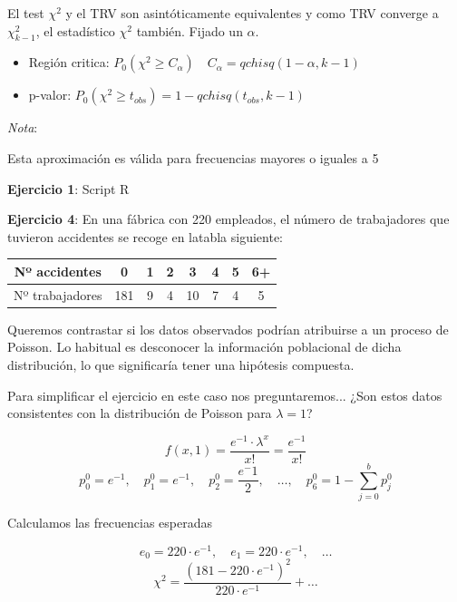 El test $\chi^2$ y el TRV son asintóticamente equivalentes y como TRV converge a $\chi^2_{k-1}$, el estadístico $\chi^2$ también.
Fijado un $\alpha$.
\begin{itemize}
    \item Región critica: $P_0(\chi^2 \geq C_\alpha) \quad C_\alpha=qchisq(1-\alpha,k-1)$
    \item p-valor: $P_0(\chi^2 \geq t_{obs})=1-qchisq(t_{obs},k-1)$
\end{itemize}

\noindent \textit{Nota}:

Esta aproximación es válida para frecuencias mayores o iguales a 5

\vspace{5mm}

\textbf{Ejercicio 1}: Script R

\vspace{5mm}

\textbf{Ejercicio 4}: En una fábrica con 220 empleados, el número de trabajadores que tuvieron accidentes se recoge en latabla siguiente:

\begin{table}[!h]
    \centering
    \begin{tabular}{|c|c|c|c|c|c|c|c|}
        \hline
        {Nº accidentes} & 0 & 1 & 2 & 3 & 4 & 5 & 6+ \\ \hline
        {Nº trabajadores} & 181 & 9 & 4 & 10 & 7 & 4 & 5 \\ \hline
    \end{tabular}
\end{table}

Queremos contrastar si los datos observados podrían atribuirse a un proceso de Poisson. Lo habitual es desconocer la información poblacional de dicha distribución, lo que significaría tener una hipótesis compuesta.

Para simplificar el ejercicio en este caso nos preguntaremos... ¿Son estos datos consistentes con la distribución de Poisson para $\lambda=1$?

\[
    f(x,1)=\frac{e^{-1}\cdot \lambda^x}{x!}=\frac{e^{-1}}{x!}
\]
\[
    p_0^0=e^{-1} ,\quad p_1^0=e^{-1} ,\quad p_2^0=\frac{e^-1}{2} ,\quad \dots,\quad p_6^0=1-\sum_{j=0}^{b}p_j^0
\]

Calculamos las frecuencias esperadas

\[
    e_0=220 \cdot e^{-1},\quad e_1=220 \cdot e^{-1}, \quad \dots
\]
\[
    \chi^2=\frac{(181-220 \cdot e^{-1})^2}{220 \cdot e^{-1}}+\dots
\]

